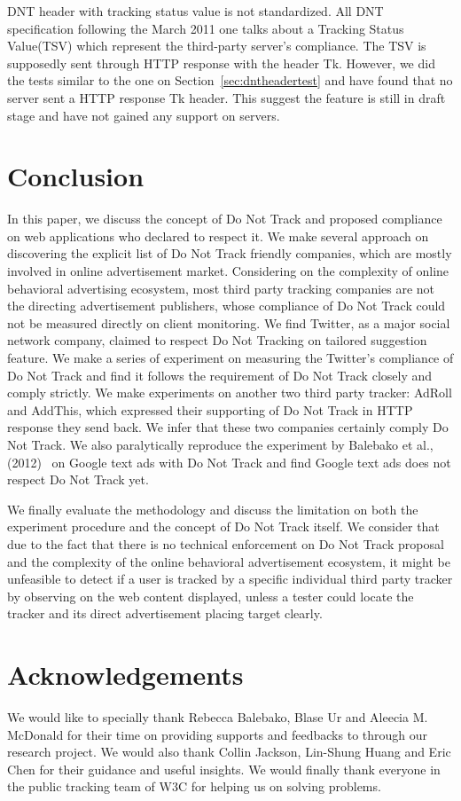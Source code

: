 \documentclass{sig-alternate}
\begin{document}
DNT header with tracking status value is not standardized. All DNT specification following the March 2011 one talks about a Tracking Status Value(TSV) which represent the third-party server’s compliance. The TSV is supposedly sent through HTTP response with the header Tk. However, we did the tests similar to the one on Section~\ref{sec:dntheadertest} and have found that no server sent a HTTP response Tk header. This suggest the feature is still in draft stage and have not gained any support on servers.

\section{Conclusion} \label{sec:conclusion}

In this paper, we discuss the concept of Do Not Track and proposed compliance on web applications who declared to respect it. We make several approach on discovering the explicit list of Do Not Track friendly companies, which are mostly involved in online advertisement market. Considering on the complexity of online behavioral advertising ecosystem, most third party tracking companies are not the directing advertisement publishers, whose compliance of Do Not Track could not be measured directly on client monitoring. We find Twitter, as a major social network company, claimed to respect Do Not Tracking on tailored suggestion feature. We make a series of experiment on measuring the Twitter's compliance of Do Not Track and find it follows the requirement of Do Not Track closely and comply strictly. We make experiments on another two third party tracker: AdRoll and AddThis, which expressed their supporting of Do Not Track in HTTP response they send back. We infer that these two companies certainly comply Do Not Track. We also paralytically reproduce the experiment by Balebako et al., (2012)~\cite{balebako2012measuring} on Google text ads with Do Not Track and find Google text ads does not respect Do Not Track yet. 

We finally evaluate the methodology and discuss the limitation on both the experiment procedure and the concept of Do Not Track itself. We consider that due to the fact that there is no technical enforcement on Do Not Track proposal and the complexity of the online behavioral advertisement ecosystem, it might be unfeasible to detect if a user is tracked by a specific individual third party tracker by observing on the web content displayed, unless a tester could locate the tracker and its direct advertisement placing target clearly.

\section*{Acknowledgements}

We would like to specially thank Rebecca Balebako, Blase Ur and Aleecia M. McDonald for their time on providing supports and feedbacks to through our research project. We would also thank Collin Jackson, Lin-Shung Huang and Eric Chen for their guidance and useful insights. We would finally thank everyone in the public tracking team of W3C for helping us on solving problems.


\end{document}
